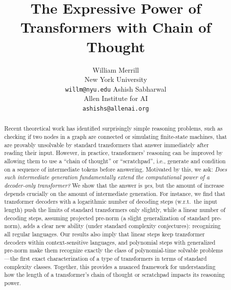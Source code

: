 \documentclass{article} %
\title{The Expressive Power of Transformers with Chain of Thought}
\author{William Merrill \\
New York University \\
\texttt{willm@nyu.edu}
\And
Ashish Sabharwal \\
Allen Institute for AI \\
\texttt{ashishs@allenai.org}
}
\newcommand\change[1]{{\color{blue} #1}}
\renewcommand\change[1]{#1}
\newcommand\changeC[1]{{\color{teal} #1}}
\renewcommand\changeC[1]{#1}
\begin{document}
\maketitle

\begin{abstract}
Recent theoretical work has identified surprisingly simple reasoning problems, such as checking if two nodes in a graph are connected or simulating finite-state machines, that are provably unsolvable by standard transformers that answer immediately after reading their input. However, in practice, transformers' reasoning can be improved by allowing them to use a ``chain of thought'' or ``scratchpad'', i.e., generate and condition on a sequence of intermediate tokens before answering. Motivated by this, we ask: \emph{Does such intermediate generation fundamentally extend the computational power of a decoder-only transformer?} We show that the answer is \emph{yes}, but the amount of increase depends crucially on the amount of intermediate generation. For instance, we find that transformer decoders with a logarithmic number of decoding steps (w.r.t.\ the input length) push the limits of standard transformers only slightly, while a linear number of decoding steps\changeC{, assuming projected pre-norm (a slight generalization of standard pre-norm),} adds a clear new ability (under standard complexity conjectures): recognizing all regular languages. Our results also imply that linear steps keep transformer decoders within context-sensitive languages, and polynomial steps \change{with generalized pre-norm} make them recognize exactly the class of polynomial-time solvable problems---the first exact characterization of a type of transformers in terms of standard complexity classes. Together, this provides a nuanced framework for understanding how the length of a transformer’s chain of thought or scratchpad impacts its reasoning power.


\end{abstract}
\end{document}

